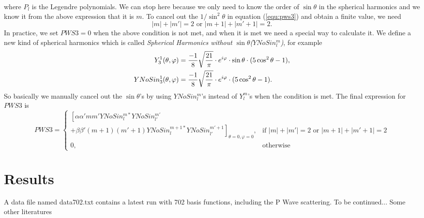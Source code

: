 \documentclass[british,english]{article}
\numberwithin{equation}{section}
\numberwithin{figure}{section}
\begin{document}
where $P_l$ is the Legendre polynomials. We can stop here because we only need to know the order of $\sin \theta$ in the spherical harmonics and we know it from the above expression that it is $m$. To cancel out the $1/\sin ^2 \theta$ in equation (\ref{equ:pws3}) and obtain a finite value, we need
\begin{equation} 
|m|+|m'|=2 \text{ or } |m+1|+|m'+1|=2.
\end{equation}
 In practice, we set $PWS3=0$ when the above condition is not met, and when it is met we need a special way to calculate it. We define a new kind of spherical harmonics which is called \emph{Spherical Harmonics without $\sin \theta$($YNoSin_l^m$)}, for example
\begin{equation}
\begin{aligned}
Y_{3}^{1}(\theta ,\varphi )&={-1 \over 8}{\sqrt {21 \over \pi }}\cdot e^{i\varphi }\cdot \sin \theta \cdot (5\cos ^{2}\theta -1),\\
YNoSin_{3}^{1}(\theta ,\varphi )&={-1 \over 8}{\sqrt {21 \over \pi }}\cdot e^{i\varphi }\cdot (5\cos ^{2}\theta -1).
\end{aligned}
\end{equation}
So basically we manually cancel out the $\sin \theta$'s by using $YNoSin_l^m$'s instead of $Y_l^m$'s when the condition is met. The final expression for $PWS3$ is
\begin{equation}
PWS3=
\begin{cases}
   \left[\alpha\alpha'mm'YNoSin_l^{m*} YNoSin_{l'}^{m'}\right.\\
   +\left.\beta\beta'(m+1)(m'+1)YNoSin_{l}^{m+1*}YNoSin_{l'}^{m'+1}\right]_{\theta=0,\varphi=0} ,& \text{if } |m|+|m'|=2 \text{ or } |m+1|+|m'+1|=2\\
    0,              & \text{otherwise}
\end{cases}
\end{equation}
\section{Results}
A data file named data702.txt contains a latest run with 702 basis functions, including the P Wave scattering. To be continued... 
Some other literatures\cite{Balewski2014,Bendkowsky2009,Kurz2013,Bendkowsky2010}


\end{document}
